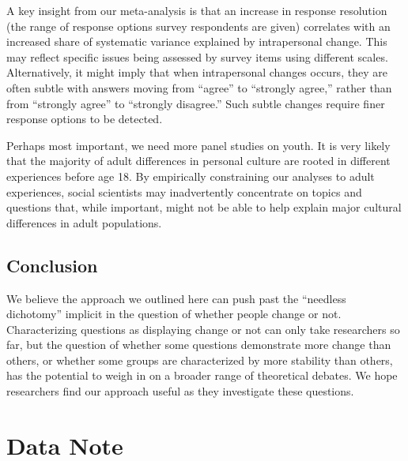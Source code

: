 \documentclass[
  12pt,
]{article}
\begin{document}
A key insight from our meta-analysis is that an increase in response
resolution (the range of response options survey respondents are given)
correlates with an increased share of systematic variance explained by
intrapersonal change. This may reflect specific issues being assessed by
survey items using different scales. Alternatively, it might imply that
when intrapersonal changes occurs, they are often subtle with answers
moving from ``agree'' to ``strongly agree,'' rather than from ``strongly
agree'' to ``strongly disagree.'' Such subtle changes require finer
response options to be detected.

Perhaps most important, we need more panel studies on youth. It is very
likely that the majority of adult differences in personal culture are
rooted in different experiences before age 18. By empirically
constraining our analyses to adult experiences, social scientists may
inadvertently concentrate on topics and questions that, while important,
might not be able to help explain major cultural differences in adult
populations.

\hypertarget{conclusion}{%
\subsection{Conclusion}\label{conclusion}}

We believe the approach we outlined here can push past the ``needless
dichotomy'' implicit in the question of whether people change or not.
Characterizing questions as displaying change or not can only take
researchers so far, but the question of whether some questions
demonstrate more change than others, or whether some groups are
characterized by more stability than others, has the potential to weigh
in on a broader range of theoretical debates. We hope researchers find
our approach useful as they investigate these questions.

\hypertarget{data-note}{%
\section{Data Note}\label{data-note}}
\end{document}
